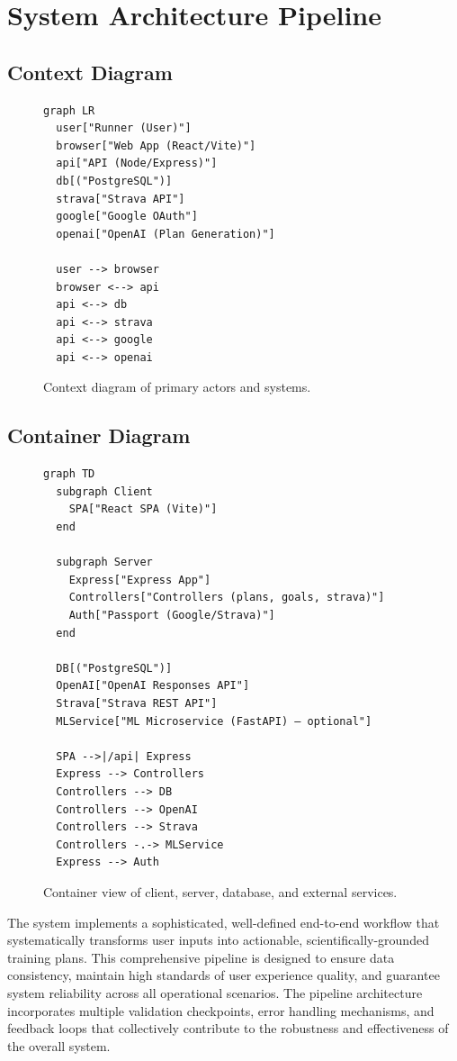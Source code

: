\section{System Architecture Pipeline}

\subsection*{Context Diagram}
\begin{figure}[h]
\centering
\begin{minipage}{0.95\linewidth}
\begin{verbatim}
graph LR
  user["Runner (User)"]
  browser["Web App (React/Vite)"]
  api["API (Node/Express)"]
  db[("PostgreSQL")]
  strava["Strava API"]
  google["Google OAuth"]
  openai["OpenAI (Plan Generation)"]

  user --> browser
  browser <--> api
  api <--> db
  api <--> strava
  api <--> google
  api <--> openai
\end{verbatim}
\end{minipage}
\caption{Context diagram of primary actors and systems.}
\end{figure}

\subsection*{Container Diagram}
\begin{figure}[h]
\centering
\begin{minipage}{0.95\linewidth}
\begin{verbatim}
graph TD
  subgraph Client
    SPA["React SPA (Vite)"]
  end

  subgraph Server
    Express["Express App"]
    Controllers["Controllers (plans, goals, strava)"]
    Auth["Passport (Google/Strava)"]
  end

  DB[("PostgreSQL")]
  OpenAI["OpenAI Responses API"]
  Strava["Strava REST API"]
  MLService["ML Microservice (FastAPI) — optional"]

  SPA -->|/api| Express
  Express --> Controllers
  Controllers --> DB
  Controllers --> OpenAI
  Controllers --> Strava
  Controllers -.-> MLService
  Express --> Auth
\end{verbatim}
\end{minipage}
\caption{Container view of client, server, database, and external services.}
\end{figure}


The system implements a sophisticated, well-defined end-to-end workflow that systematically transforms user inputs into actionable, scientifically-grounded training plans. This comprehensive pipeline is designed to ensure data consistency, maintain high standards of user experience quality, and guarantee system reliability across all operational scenarios. The pipeline architecture incorporates multiple validation checkpoints, error handling mechanisms, and feedback loops that collectively contribute to the robustness and effectiveness of the overall system.


